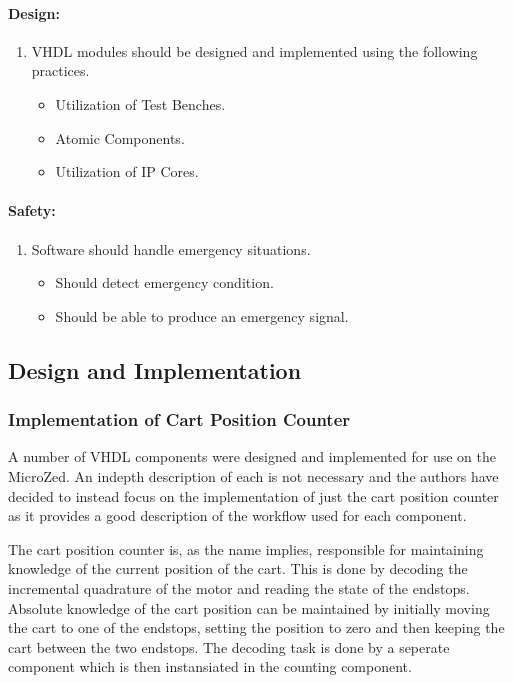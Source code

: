 \paragraph{Design:}
\begin{enumerate}[resume]
	\item VHDL modules should be designed and implemented using the following practices.
	\label{enum:vhdl_implementation_practices}
	\begin{itemize}
		\item Utilization of Test Benches.
		\item Atomic Components.
		\item Utilization of IP Cores.
	\end{itemize}
\end{enumerate}
\paragraph{Safety:}
\begin{enumerate}[resume]
	\item Software should handle emergency situations.
	\label{enum:software_should_handle_emergency}
	\begin{itemize}
		\item Should detect emergency condition.
		\item Should be able to produce an emergency signal.
	\end{itemize}
\end{enumerate}

\subsection{Design and Implementation} %
\label{sub:implementation}
\subsubsection{Implementation of Cart Position Counter} %
\label{ssub:vhdl_components}
A number of VHDL components were designed and implemented for use on the MicroZed.
An indepth description of each is not necessary and the authors have decided to instead focus on the implementation of just the cart position counter as it provides a good description of the workflow used for each component.

The cart position counter is, as the name implies, responsible for maintaining knowledge of the current position of the cart.
This is done by decoding the incremental quadrature of the motor and reading the state of the endstops.
Absolute knowledge of the cart position can be maintained by initially moving the cart to one of the endstops, setting the position to zero and then keeping the cart between the two endstops.
The decoding task is done by a seperate component which is then instansiated in the counting component.

